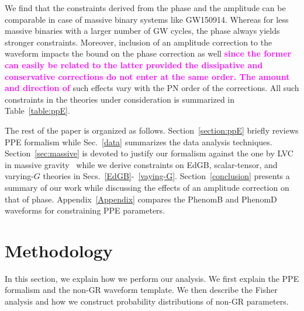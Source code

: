 \documentclass[prd,twocolumn,nofootinbib]{revtex4-1}
\newcommand{\kent}[1]{\textcolor{magenta}{\textbf{#1}} }
\begin{document}
We find that the constraints derived from the phase and the amplitude can be comparable in case of massive binary systems like GW150914. Whereas for less massive binaries with a larger number of GW cycles, the phase always yields stronger constraints. Moreover, inclusion of an amplitude correction to the waveform impacts the bound on the phase correction as well \kent{since the former can easily be related to the latter provided the dissipative and conservative corrections do not enter at the same order. The amount and direction of} such effects vary with the PN order of the corrections. All such constraints in the theories under consideration is summarized in Table~\ref{table:ppE}.


The rest of the paper is organized as follows. Section~\ref{section:ppE} briefly reviews PPE formalism while Sec.~\ref{data} summarizes the data analysis techniques. Section~\ref{sec:massive} is devoted to justify our formalism against the one by LVC in massive gravity~\cite{TheLIGOScientific:2016src} while we derive constraints on EdGB, scalar-tensor, and varying-$G$ theories in Secs.~\ref{EdGB}-~\ref{vaying-G}. Section~\ref{conclusion} presents a summary of our work while discussing the effects of an amplitude correction on that of phase. Appendix~\ref{Appendix} compares the PhenomB and PhenomD waveforms for constraining PPE parameters.

\section{Methodology}\label{section:method}

In this section, we explain how we perform our analysis. We first explain the PPE formalism and the non-GR waveform template. We then describe the Fisher analysis and how we construct probability distributions of non-GR parameters.

\end{document}
